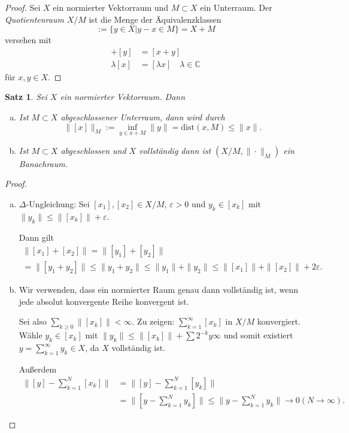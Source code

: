 \documentclass[
paper=a4,
bibtotocnumbered,
liststotocnumbered,
tablecaptionabove,
pointlessnumbers,
twoside,
openright,
10pt
]
{report}
\newcommand{\dist}{\mathrm{dist}}
\newtheorem{satz}[thm]{Satz}
\theoremstyle{definition}
\numberwithin{equation}{chapter}
\begin{document}
\begin{proof}
Sei $X$ ein normierter Vektorraum und $M\subset X$ ein Unterraum. Der \emph{Quotientenraum} $X/M$ ist die Menge der Äquivalenzklassen
\begin{equation}
[x] := \{y\in X| y-x\in M\} = X+M
\end{equation}
versehen mit
\begin{align*}
[x] + [y] &= [x+y]\\
\lambda[x] &= [\lambda x] \quad \lambda \in \mathbb C
\end{align*}
für $x,y\in X$.
\end{proof}

\begin{satz}\label{4.9}
Sei $X$ ein normierter Vektorraum. Dann 
\begin{enumerate}[a)]
\item Ist $M\subset X$ abgeschlossener Unterraum, dann wird durch
\begin{equation}
\| [x] \|_M := \inf_{y\in x+M} \| y\|= \dist(x,M)\le \|x\|.
\end{equation}
\item Ist $M\subset X$ abgeschlossen und $X$ vollständig dann ist $(X/M, \| \cdot \|_M)$ ein Banachraum.
\end{enumerate}
\end{satz}
\begin{proof}
\begin{enumerate}[a)]
\item $\Delta$-Ungleichung: Sei $[x_1], [x_2] \in X/M$, $\varepsilon>0$ und $y_k \in [x_k]$ mit $\| y_k \| \le \| [x_k] \| + \varepsilon$.

Dann gilt
\begin{align*}
\| [x_1 ] + [x_2] \| = \| [y_1] + [y_2]\|\\
= \| [y_1 + y_2] \| \le \| y_1 + y_2\| \le \| y_1\| + \|y_2\| \le \| [x_1] \| + \| [x_2] \| + 2\varepsilon.
\end{align*}
\item Wir verwenden, dass ein normierter Raum genau dann vollständig ist, wenn jede absolut konvergente Reihe konvergent ist.

Sei also $\sum_{k\ge 0} \| [x_k] \| <\infty$. Zu zeigen: $\sum_{k=1}^\infty [x_k]$ in $X/M$ konvergiert. Wähle $y_k\in [x_k]$ mit $\| y_k\| \le \| [x_k]\| + \sum 2^{-k} y\infty$ und somit existiert $y= \sum_{k=1}^\infty y_k \in X$, da $X$ vollständig ist.

Außerdem
\begin{align*}
\| [y] - \sum_{k=1}^N [x_k] \| &= \| [y] - \sum_{k=1}^N [y_k] \| \\
&= \| [y-\sum_{k=1}^N y_k] \| \le \| y- \sum_{k=1}^N y_k \| \to 0 (N\to \infty).
\end{align*}
\end{enumerate}
\end{proof}
\end{document}
